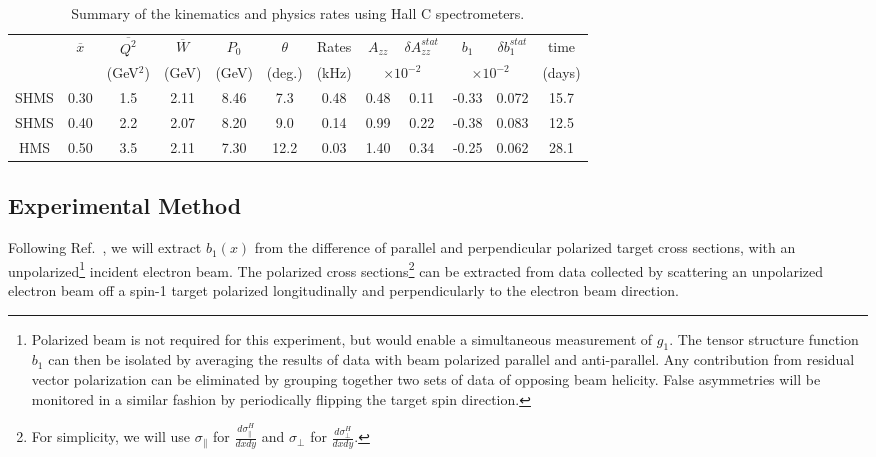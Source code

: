 \begin{table}
\begin{center}
\begin{tabular}{c|ccc|cc|c|cc|cc|c}
& $\overline{x}$  & $\overline{Q^2}$      &  $\overline{W}$  &    $P_0$    &    $\theta$  &  Rates & $A_{zz}$ & $\delta A_{zz}^{stat}$    & $b_1$  & $\delta b_1^{stat}$ & time   \\
&  ~     & (GeV$^2$)  & (GeV) & (GeV)  &     (deg.)  &   (kHz)  & \multicolumn{2}{|c|}{$\times 10^{-2}$} &  \multicolumn{2}{|c|}{$\times 10^{-2}$}    & (days) \\
\hline\hline
SHMS & 0.30&  1.5&  2.11&  8.46&     7.3&    0.48&   0.48&   0.11&  -0.33&   0.072&   15.7 \\
SHMS & 0.40&  2.2&  2.07&  8.20&     9.0&    0.14&   0.99&   0.22&  -0.38&   0.083&   12.5 \\
HMS  & 0.50&  3.5&  2.11&  7.30&    12.2&    0.03&   1.40 &   0.34&  -0.25&   0.062&   28.1 \\  

\hline\hline
\end{tabular}
\caption{\label{RATES}Summary of the kinematics and physics rates using Hall C  spectrometers.}
\end{center}
\end{table}


\subsection{Experimental Method}
\setcounter{footnote}{2}
Following Ref.~\cite{Hoodbhoy:1988am},  we will extract $b_1(x)$ from
the difference of parallel and perpendicular polarized target cross sections, 
with an unpolarized\footnote{Polarized beam is not required for this experiment, but would enable a simultaneous measurement of $g_1$.  The
tensor structure function $b_1$ can then be isolated by averaging the results of data with beam polarized parallel and anti-parallel.  Any contribution from residual vector polarization can be eliminated by grouping together two sets of data of opposing beam helicity.  False asymmetries will be monitored in a similar fashion by periodically flipping the target spin direction.} incident electron beam.  
The polarized cross sections\footnote{For simplicity, we will use $\sigma_{\parallel}$ for $\frac{d\sigma_{\parallel}^H}{dxdy}$ and $\sigma_{\perp}$ for $\frac{d\sigma_{\perp}^H}{dxdy}$.} 
can be extracted from data collected by scattering an unpolarized electron beam off a spin-1 target
polarized longitudinally and perpendicularly to the electron beam direction.
%

